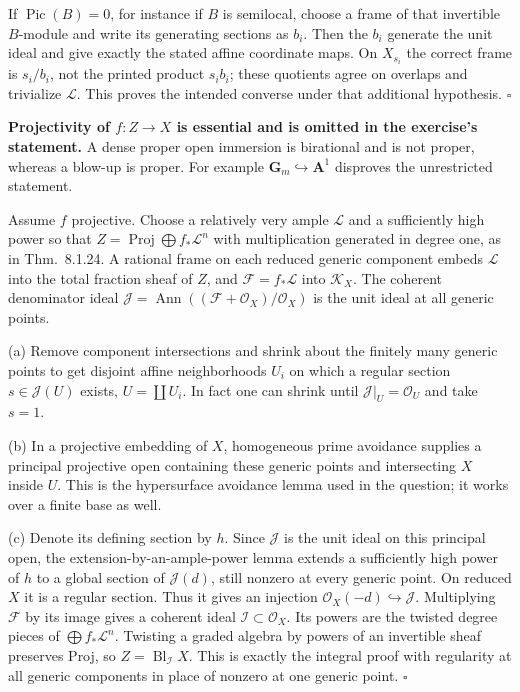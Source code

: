 \documentclass[11pt]{article}
\let\chapterexercise\exercise
\renewcommand{\exercise}[2]{\Needspace{8\baselineskip}\chapterexercise{#1}{#2}}
\begin{document}
If $\operatorname{Pic}(B)=0$, for instance if $B$ is semilocal, choose a frame of that invertible $B$-module and write its generating sections as $b_i$. Then the $b_i$ generate the unit ideal and give exactly the stated affine coordinate maps. On $X_{s_i}$ the correct frame is $s_i/b_i$, not the printed product $s_i b_i$; these quotients agree on overlaps and trivialize $\mathcal L$. This proves the intended converse under that additional hypothesis. \hfill$\square$

\pf
\textbf{Projectivity of $f:Z\to X$ is essential and is omitted in the exercise's statement.} A dense proper open immersion is birational and is not proper, whereas a blow-up is proper. For example $\mathbf G_m\hookrightarrow\mathbf A^1$ disproves the unrestricted statement.

Assume $f$ projective. Choose a relatively very ample $\mathcal L$ and a sufficiently high power so that $Z=\operatorname{Proj}\bigoplus f_*\mathcal L^n$ with multiplication generated in degree one, as in Thm.~8.1.24. A rational frame on each reduced generic component embeds $\mathcal L$ into the total fraction sheaf of $Z$, and $\mathcal F=f_*\mathcal L$ into $\mathcal K_X$. The coherent denominator ideal $\mathcal J=\operatorname{Ann}((\mathcal F+\mathcal O_X)/\mathcal O_X)$ is the unit ideal at all generic points.

(a) Remove component intersections and shrink about the finitely many generic points to get disjoint affine neighborhoods $U_i$ on which a regular section $s\in\mathcal J(U)$ exists, $U=\coprod U_i$. In fact one can shrink until $\mathcal J|_U=\mathcal O_U$ and take $s=1$.

(b) In a projective embedding of $X$, homogeneous prime avoidance supplies a principal projective open containing these generic points and intersecting $X$ inside $U$. This is the hypersurface avoidance lemma used in the question; it works over a finite base as well.

(c) Denote its defining section by $h$. Since $\mathcal J$ is the unit ideal on this principal open, the extension-by-an-ample-power lemma extends a sufficiently high power of $h$ to a global section of $\mathcal J(d)$, still nonzero at every generic point. On reduced $X$ it is a regular section. Thus it gives an injection $\mathcal O_X(-d)\hookrightarrow\mathcal J$. Multiplying $\mathcal F$ by its image gives a coherent ideal $\mathcal I\subset\mathcal O_X$. Its powers are the twisted degree pieces of $\bigoplus f_*\mathcal L^n$. Twisting a graded algebra by powers of an invertible sheaf preserves Proj, so $Z=\operatorname{Bl}_{\mathcal I}X$. This is exactly the integral proof with regularity at all generic components in place of nonzero at one generic point. \hfill$\square$
\end{document}
